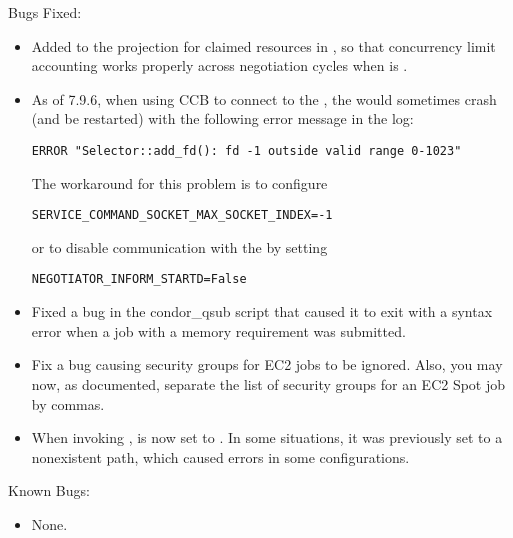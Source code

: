 \noindent Bugs Fixed:

\begin{itemize}

\item Added  to the projection for claimed
resources in , so that concurrency limit accounting 
works properly across negotiation cycles when 
 is .

\item As of 7.9.6, when using CCB to connect to the ,
  the  would sometimes crash (and be restarted)
  with the following error message in the log:

\begin{verbatim}
ERROR "Selector::add_fd(): fd -1 outside valid range 0-1023"
\end{verbatim}

The workaround for this problem is to configure
\begin{verbatim}
SERVICE_COMMAND_SOCKET_MAX_SOCKET_INDEX=-1
\end{verbatim}
or to disable communication with the  by setting
\begin{verbatim}
NEGOTIATOR_INFORM_STARTD=False
\end{verbatim}

\item Fixed a bug in the condor\_qsub script that caused it to exit
with a syntax error when a job with a memory requirement was
submitted.

\item Fix a bug causing security groups for EC2 jobs to be ignored.  Also,
you may now, as documented, separate the list of security groups for
an EC2 Spot job by commas.

\item When invoking ,  is now
  set to .  In some situations, it was previously set
  to a nonexistent path, which caused errors in some configurations.

\end{itemize}

\noindent Known Bugs:

\begin{itemize}

\item None.

\end{itemize}

